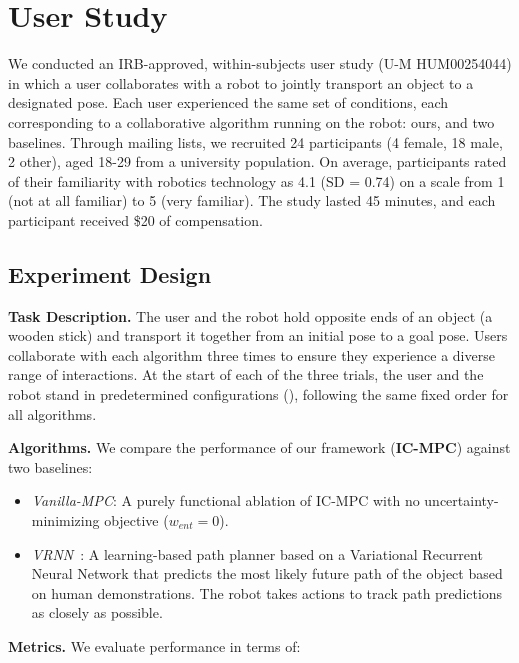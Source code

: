\section{User Study}\label{sec:evaluation}

We conducted an IRB-approved, within-subjects user study (U-M HUM00254044) in which a user collaborates with a robot to jointly transport an object to a designated pose. Each user experienced the same set of conditions, each corresponding to a collaborative algorithm running on the robot: ours, and two baselines. Through mailing lists, we recruited 24 participants (4 female, 18 male, 2 other), aged 18-29 from a university population. On average, participants rated of their familiarity with robotics technology as 4.1 (SD = 0.74) on a scale from 1 (not at all familiar) to 5 (very familiar). The study lasted 45 minutes, and each participant received \$20 of compensation.


\subsection{Experiment Design}

\textbf{Task Description.} The user and the robot hold opposite ends of an object (a wooden stick) and transport it together from an initial pose to a goal pose.
Users collaborate with each algorithm three times to ensure they experience a diverse range of interactions.
At the start of each of the three trials, the user and the robot stand in predetermined configurations (), following the same fixed order for all algorithms.

\textbf{Algorithms.}
We compare the performance of our framework (\textbf{IC-MPC}) against two baselines:

\begin{itemize}
    \item \emph{Vanilla-MPC}: A purely functional ablation of IC-MPC with no uncertainty-minimizing objective ($w_{ent} = 0$).
    \item \emph{VRNN}~\citep{ng2023takes}: A learning-based path planner based on a Variational Recurrent Neural Network that predicts the most likely future path of the object based on human demonstrations. The robot takes actions to track path predictions as closely as possible.
\end{itemize}

\textbf{Metrics.} We evaluate performance in terms of:

